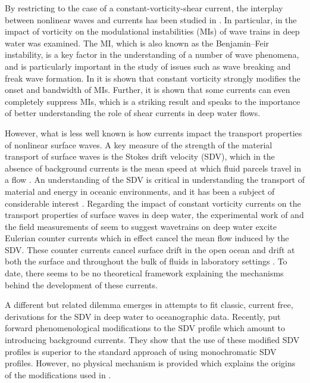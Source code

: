 \documentclass{JFM_Style/jfm}
\begin{document}
By restricting to the case of a constant-vorticity-shear current, the interplay between nonlinear waves and currents has been studied in \cite{brevik,simmen,baumstein,choi,thomas2012nonlinear}. In particular, in \cite{thomas2012nonlinear} the impact of vorticity on the modulational instabilities (MIs) of wave trains in deep water was examined.  The MI, which is also known as the Benjamin--Feir instability, is a key factor in the understanding of a number of wave phenomena, and is particularly important in the study of issues such as wave breaking and freak wave formation.  In \cite{thomas2012nonlinear} it is shown that constant vorticity strongly modifies the onset and bandwidth of MIs. Further, it is shown that some currents can even completely suppress MIs, which is a striking result and speaks to the importance of better understanding the role of shear currents in deep water flows.  

However, what is less well known is how currents impact the transport properties of nonlinear surface waves.  A key measure of the strength of the material transport of surface waves is the Stokes drift velocity (SDV), which in the absence of background currents is the mean speed at which fluid parcels travel in a flow \cite{longuet}.  An understanding of the SDV is critical in understanding the transport of material and energy in oceanic environments, and it has been a subject of considerable interest \cite{breivik,mcwilliams,webb}.  Regarding the impact of constant vorticity currents on the transport properties of surface waves in deep water, the experimental work of \cite{monismith} and the field measurements of \cite{smith} seem to suggest wavetrains on deep water excite Eulerian counter currents which in effect cancel the mean flow induced by the SDV.  These counter currents cancel surface drift in the open ocean \cite{smith} and drift at both the surface and throughout the bulk of fluids in laboratory settings \cite{monismith}.  To date, there seems to be no theoretical framework explaining the mechanisms behind the development of these currents.  

A different but related dilemma emerges in attempts to fit classic, current free, derivations for the SDV in deep water to oceanographic data.  Recently, \cite{breivik} put forward phenomenological modifications to the SDV profile which amount to introducing background currents. They show that the use of these modified SDV profiles is superior to the standard approach of using monochromatic SDV profiles.  However, no physical mechanism is provided which explains the origins of the modifications used in \cite{breivik}.
\end{document}
